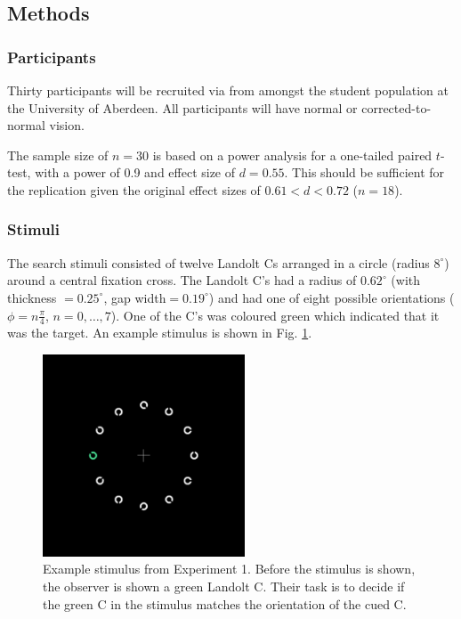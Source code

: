 \documentclass[smallextended]{svjour3}       %
\begin{document}
\subsection{Methods}

\subsubsection{Participants}

Thirty participants will be recruited via from amongst the student population at the University of Aberdeen. All participants will have normal or corrected-to-normal vision. 

The sample size of $n=30$ is based on a power analysis for a one-tailed paired $t$-test, with a power of 0.9 and effect size of $d=0.55$. This should be sufficient for the replication given the original effect sizes of $0.61<d<0.72$ ($n=18$).


\subsubsection{Stimuli}

The search stimuli consisted of twelve Landolt Cs arranged in a circle (radius $8^{\circ}$) around a central fixation cross. The Landolt C's had a radius of $0.62^{\circ}$ (with thickness $=0.25^{\circ}$, gap width$=0.19^{\circ}$) and had one of eight possible orientations ($\phi=n\frac{\pi}{4}$, $n=0,\ldots,7$). One of the C's was coloured green which indicated that it was the target. An example stimulus is shown in Fig. \ref{fig:exp1stimulus}.

\begin{figure}
\centering
\includegraphics[width=6cm]{figs/exStimExp1.png}
\caption{Example stimulus from Experiment 1. Before the stimulus is shown, the observer is shown a green Landolt C. Their task is to decide if the green C in the stimulus matches the orientation of the cued C.}
\label{fig:exp1stimulus}
\end{figure}
\end{document}

